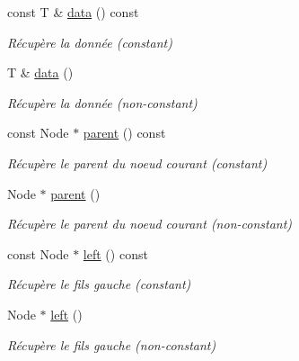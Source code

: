 \begin{DoxyCompactItemize}
const T \& \hyperlink{classBSTreeNode_a74a9baf20cf5ae5bf40ca83a5a611db9}{data} () const
\begin{DoxyCompactList}\small\item\em Récupère la donnée (constant) \end{DoxyCompactList}\item 
\mbox{\label{classBSTreeNode_adab11a903f0e299e736a3fb29fb8dead}} 
T \& \hyperlink{classBSTreeNode_adab11a903f0e299e736a3fb29fb8dead}{data} ()
\begin{DoxyCompactList}\small\item\em Récupère la donnée (non-\/constant) \end{DoxyCompactList}\item 
\mbox{\label{classBSTreeNode_aa1a36ab9699282b3b0b665951735a387}} 
const Node $\ast$ \hyperlink{classBSTreeNode_aa1a36ab9699282b3b0b665951735a387}{parent} () const
\begin{DoxyCompactList}\small\item\em Récupère le parent du noeud courant (constant) \end{DoxyCompactList}\item 
\mbox{\label{classBSTreeNode_a331cbf0e1756db6a3f0ec0e4c5288aba}} 
Node $\ast$ \hyperlink{classBSTreeNode_a331cbf0e1756db6a3f0ec0e4c5288aba}{parent} ()
\begin{DoxyCompactList}\small\item\em Récupère le parent du noeud courant (non-\/constant) \end{DoxyCompactList}\item 
\mbox{\label{classBSTreeNode_a0167920e3e97c4f41900482c2c02145e}} 
const Node $\ast$ \hyperlink{classBSTreeNode_a0167920e3e97c4f41900482c2c02145e}{left} () const
\begin{DoxyCompactList}\small\item\em Récupère le fils gauche (constant) \end{DoxyCompactList}\item 
\mbox{\label{classBSTreeNode_a4561562eb320ae7ab88f9edb7b872022}} 
Node $\ast$ \hyperlink{classBSTreeNode_a4561562eb320ae7ab88f9edb7b872022}{left} ()
\begin{DoxyCompactList}\small\item\em Récupère le fils gauche (non-\/constant) \end{DoxyCompactList}\item 

\end{DoxyCompactItemize}
